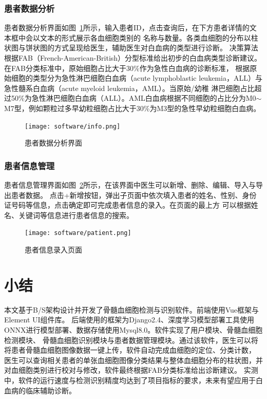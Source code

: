 \subsubsection{患者数据分析}
患者数据分析界面如图~\ref{fig:interface_info}所示，输入患者ID，点击查询后，在下方患者详情的文本框中会以文本的形式展示各血细胞类别的
名称与数量。各类血细胞的分布以柱状图与饼状图的方式呈现给医生，辅助医生对白血病的类型进行诊断。
决策算法根据FAB（French-American-British）分型标准给出初步的白血病类型诊断建议。在FAB分类标准中，原始细胞占比大于30\%作为急性白血病的诊断标准，
根据原始细胞的类型分为急性淋巴细胞白血病（acute lymphoblastic leukemia，ALL）与急性髓系白血病（acute myeloid leukemia，AML）。当原始/幼稚
淋巴细胞占比超过50\%为急性淋巴细胞白血病（ALL）。AML白血病根据不同细胞的占比分为M0$\sim$M7型，例如颗粒过多早幼粒细胞占比大于30\%为M3型的急性早幼粒细胞白血病。
\begin{figure}[htbp]                     
  \centering                      
  \texttt{[image: software/info.png]}                      
  \caption{患者数据分析界面}                      
  \label{fig:interface_info}       
\end{figure}
\subsubsection{患者信息管理}
患者信息管理界面如图~\ref{fig:interface_patient}所示，在该界面中医生可以新增、删除、编辑、导入与导出患者数据。
点击+新增按钮，弹出子页面中依次填入患者的姓名、性别、身份证号码等信息，点击确定即可完成患者信息的录入。在页面的最上方
可以根据姓名、关键词等信息进行患者信息的搜索。
\begin{figure}[htbp]                     
  \centering                      
  \texttt{[image: software/patient.png]}                      
  \caption{患者信息录入页面}                      
  \label{fig:interface_patient}       
\end{figure}
\section{小结}
本文基于B/S架构设计并开发了骨髓血细胞检测与识别软件。前端使用Vue框架与Element UI组件库。
后端使用的框架为Django2.4、深度学习模型部署工具使用ONNX进行模型部署、数据存储使用Mysql8.0。软件实现了用户模块、骨髓血细胞检测模块、
骨髓血细胞识别模块与患者数据管理模块。通过该软件，医生可以将将患者骨髓血细胞图像数据一键上传，软件自动完成血细胞的定位、分类计数，
医生可以查询相关患者的单张血细胞图像分类结果与整体血细胞分布的柱状图，并对血细胞类别进行校对与修改，软件最终根据FAB分类标准给出诊断建议。
实测中，软件的运行速度与检测识别精度均达到了项目指标的要求，未来有望应用于白血病的临床辅助诊断。
